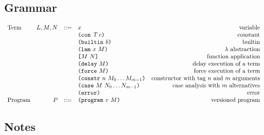 \subsection{Grammar}
\begin{minipage}{\linewidth}
    \centering
    \[\begin{array}{lrclr}
    \textrm{Term}       & L,M,N  & ::= & x                               & \textrm{variable}\\
                        &        &     & \texttt{(} \texttt{con} ~ \textit{T} ~ c \texttt{)}                    & \textrm{constant}\\
                        &        &     & \texttt{(} \texttt{builtin} ~ \mathit{b} \texttt{)}                     & \textrm{builtin}\\
                        &        &     & \texttt{(} \texttt{lam} ~ x ~ M  \texttt{)}                     & \textrm{$\lambda$ abstraction}\\
                        &        &     & \texttt{[} M ~ N \texttt{]}                     & \textrm{function application}\\
                        &        &     & \texttt{(} \texttt{delay} ~ M \texttt{)}                       & \textrm{delay execution of a term}\\
                        &        &     & \texttt{(} \texttt{force} ~ M \texttt{)}                       & \textrm{force execution of a term}\\
                        &        &     & \texttt{(} \texttt{constr} ~ n ~ M_0 \ldots M_{m-1} \texttt{)}  & \textrm{constructor with tag $n$ and $m$ arguments}\\
                        &        &     & \texttt{(} \texttt{case} ~ M ~ N_0 \ldots N_{m-1} \texttt{)}    & \textrm{case analysis with $m$ alternatives}\\
                        &        &     & \texttt{(} \texttt{error} \texttt{)}                         & \textrm{error}\\
        \textrm{Program}& P      & ::= & \texttt{(} \texttt{program} ~ v ~ M \texttt{)}                  & \textrm{versioned program}

    \end{array}\]
    \label{fig:untyped-grammar}
\end{minipage}


\subsection{Notes}
\label{sec:grammar-notes}

